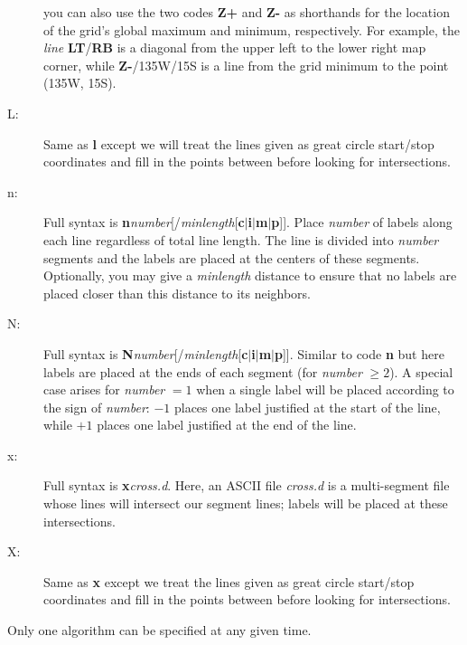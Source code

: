 \begin{description}
you can also use the two codes {\bf Z+} and {\bf Z-} as shorthands for the location of the grid's global
maximum and minimum, respectively.  For example, the {\it line} {\bf LT}/{\bf RB} is a diagonal from the
upper left to the lower right map corner, while {\bf Z-}/135W/15S is a line from the grid minimum to the point
(135\DS W, 15\DS S).
\item [L:] Same as {\bf l} except we will treat the lines given as great circle start/stop coordinates and fill in
the points between before looking for intersections.
\item [n:] Full syntax is {\bf n}{\it number}[/{\it minlength}[{\bf c$|$i$|$m$|$p}]].  Place
{\it number} of labels along each line regardless of total line length.  The line is divided into {\it number}
segments and the labels are placed at the centers of these segments.  Optionally, you may give a {\it minlength}
distance to ensure that no labels are placed closer than this distance to its neighbors.
\item [N:] Full syntax is {\bf N}{\it number}[/{\it minlength}[{\bf c$|$i$|$m$|$p}]].  Similar to
code {\bf n} but here labels are placed at the ends of each segment (for {\it number} $\geq 2$).  A special
case arises for {\it number} $= 1$ when a single label will be placed according to the sign of {\it number}:
$-1$ places one label justified at the start of the line, while $+1$ places one label justified at the end of the line.
\item [x:] Full syntax is {\bf x}{\it cross.d}.  Here, an ASCII file {\it cross.d} is
a multi-segment file whose lines will intersect our segment lines; labels will be placed at these intersections.
\item [X:] Same as {\bf x} except we treat the lines given as great circle start/stop coordinates and fill in the
points between before looking for intersections.
\end{description}
Only one algorithm can be specified at any given time.


